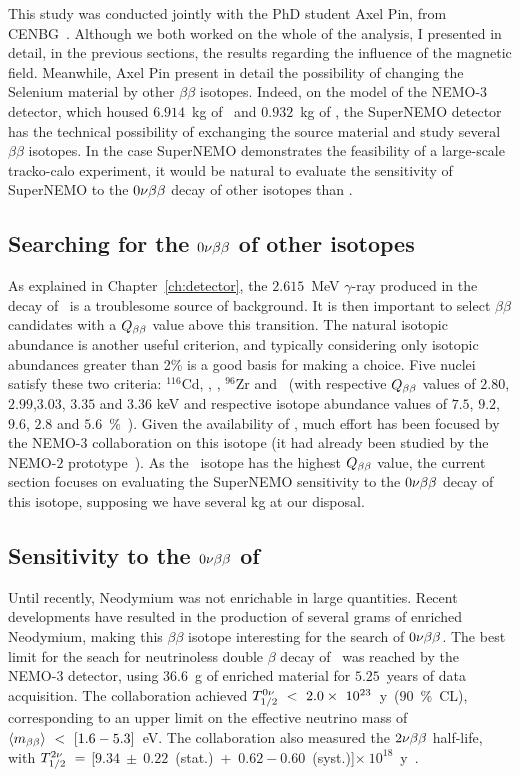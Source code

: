 This study was conducted jointly with the PhD student Axel Pin, from CENBG~\cite{AxelThesis}.
Although we both worked on the whole of the analysis, I presented in detail, in the previous sections, the results regarding the influence of the magnetic field.
Meanwhile, Axel Pin present in detail the possibility of changing the Selenium material by other $\beta\beta$ isotopes.
Indeed, on the model of the NEMO-$3$ detector, which housed $6.914$~kg of \Mo\ and $0.932$~kg of \Se, the SuperNEMO detector has the technical possibility of exchanging the source material and study several $\beta\beta$ isotopes.
In the case SuperNEMO demonstrates the feasibility of a large-scale tracko-calo experiment, it would be natural to  evaluate the sensitivity of SuperNEMO to the $0\nu\beta\beta$ decay of other isotopes than \Se.

\subsection{Searching for the $0\nu\beta\beta$ of other isotopes}

As explained in Chapter~\ref{ch:detector}, the $2.615$~MeV $\gamma$-ray produced in the decay of \Tl\ is a troublesome source of background.
It is then important to select $\beta\beta$ candidates with a $Q_{\beta\beta}$ value above this transition.
The natural isotopic abundance is another useful criterion, and typically considering only isotopic abundances greater than 2\% is a good basis for making a choice.
Five nuclei satisfy these two criteria: $^{116}$Cd, \Se, \Mo, $^{96}$Zr and \Nd\ (with respective $Q_{\beta\beta}$ values of $2.80$, $2.99$,$3.03$, $3.35$ and $3.36$ keV and respective isotope abundance values of $7.5$, $9.2$, $9.6$, $2.8$ and $5.6$~\%~\cite{art:atomic_mass}).
Given the availability of \Mo, much effort has been focused by the NEMO-$3$ collaboration on this isotope (it had already been studied by the NEMO-$2$ prototype~\cite{art:NEMO2}).
As the \Nd\ isotope has the highest $Q_{\beta\beta}$ value, the current section focuses on evaluating the SuperNEMO sensitivity to the $0\nu\beta\beta$ decay of this isotope, supposing we have several kg at our disposal.

\subsection{Sensitivity to the $0\nu\beta\beta$ of \Nd}

Until recently, Neodymium was not enrichable in large quantities.
Recent developments have resulted in the production of several grams of enriched Neodymium, making this $\beta\beta$ isotope interesting for the search of $0\nu\beta\beta$.
The best limit for the seach for neutrinoless double $\beta$ decay of \Nd\ was reached by the NEMO-$3$ detector, using $36.6$~g of enriched material for $5.25$~years of data acquisition.
The collaboration achieved $T_{1/2}^{0\nu}~<~2.0\times~10^{23}$~y~($90$~\%~CL), corresponding to an upper limit on the effective neutrino mass of $\langle m_{\beta\beta}\rangle~<~[1.6-5.3]$~eV.
The collaboration also measured the $2\nu\beta\beta$ half-life, with $T_{1/2}^{2\nu}~=~$[$9.34~\pm~0.22$~(stat.)~+~$0.62-0.60$~(syst.)]$\times~10^{18}$~y~\cite{art:NEMO3_Nd}.

